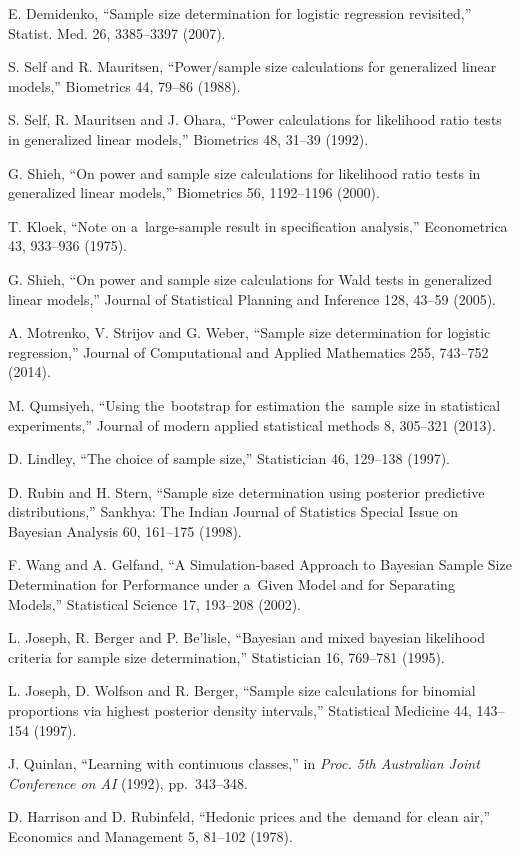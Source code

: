 \documentclass[
11pt,%
tightenlines,%
twoside,%
onecolumn,%
nofloats,%
nobibnotes,%
nofootinbib,%
superscriptaddress,%
noshowpacs,%
centertags]%
{revtex4}
\begin{document}
\begin{thebibliography}{}
	E. Demidenko, ``Sample size determination for logistic regression revisited,'' Statist. Med. 26, 3385--3397 (2007).
	
	S. Self and R. Mauritsen, ``Power/sample size calculations for generalized linear models,'' Biometrics 44, 79--86 (1988).
	
	S. Self, R. Mauritsen and J. Ohara, ``Power calculations for likelihood ratio tests in generalized linear models,'' Biometrics 48, 31--39 (1992).
	
	G. Shieh, ``On power and sample size calculations for likelihood ratio tests in generalized linear models,'' Biometrics 56, 1192--1196 (2000).
	
	T. Kloek, ``Note on a~large-sample result in specification analysis,'' Econometrica 43, 933--936 (1975).
	
	G. Shieh, ``On power and sample size calculations for Wald tests in generalized linear models,'' Journal of Statistical Planning and Inference 128, 43--59 (2005).

	A. Motrenko, V. Strijov and G. Weber, ``Sample size determination for logistic regression,'' Journal of Computational and Applied Mathematics 255, 743--752 (2014).
	
	M. Qumsiyeh, ``Using the~bootstrap for estimation the~sample size in statistical experiments,'' Journal of modern applied statistical methods 8, 305--321 (2013).
	
	D. Lindley, ``The choice of sample size,'' Statistician 46, 129--138 (1997).
	
	D. Rubin and H. Stern, ``Sample size determination using posterior predictive distributions,'' Sankhya: The Indian Journal of Statistics Special Issue on Bayesian Analysis 60, 161--175 (1998).

	F. Wang and A. Gelfand, ``A Simulation-based Approach to Bayesian Sample Size Determination for Performance under a~Given Model and for Separating Models,'' Statistical Science 17, 193--208 (2002).
	
	L. Joseph, R. Berger and P. Be'lisle, ``Bayesian and mixed bayesian likelihood criteria for sample size determination,'' Statistician 16, 769--781 (1995).
	
	L. Joseph, D. Wolfson and R. Berger, ``Sample size calculations for binomial proportions via highest posterior density intervals,'' Statistical Medicine 44, 143--154 (1997).
	
	J. Quinlan, ``Learning with continuous classes,'' in \emph{Proc. 5th Australian Joint Conference on AI} (1992), pp.~343--348.
	
	D. Harrison and D. Rubinfeld, ``Hedonic prices and the~demand for clean air,'' Economics and Management 5, 81--102 (1978).

\end{thebibliography}
\end{document}
